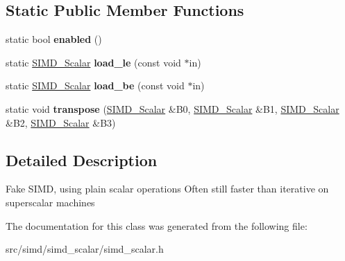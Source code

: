 \subsection*{Static Public Member Functions}
\begin{DoxyCompactItemize}
\item 
\hypertarget{classBotan_1_1SIMD__Scalar_a41ae8453f70b9fceee6469ddd85b8058}{static bool {\bfseries enabled} ()}\label{classBotan_1_1SIMD__Scalar_a41ae8453f70b9fceee6469ddd85b8058}

\item 
\hypertarget{classBotan_1_1SIMD__Scalar_a428cef88433d3a3714a86a27ee32b949}{static \hyperlink{classBotan_1_1SIMD__Scalar}{S\-I\-M\-D\-\_\-\-Scalar} {\bfseries load\-\_\-le} (const void $\ast$in)}\label{classBotan_1_1SIMD__Scalar_a428cef88433d3a3714a86a27ee32b949}

\item 
\hypertarget{classBotan_1_1SIMD__Scalar_a831917b17f550da9de4adcff57107ba2}{static \hyperlink{classBotan_1_1SIMD__Scalar}{S\-I\-M\-D\-\_\-\-Scalar} {\bfseries load\-\_\-be} (const void $\ast$in)}\label{classBotan_1_1SIMD__Scalar_a831917b17f550da9de4adcff57107ba2}

\item 
\hypertarget{classBotan_1_1SIMD__Scalar_a732fa7c90ab3b7995c0d319f9e10cfee}{static void {\bfseries transpose} (\hyperlink{classBotan_1_1SIMD__Scalar}{S\-I\-M\-D\-\_\-\-Scalar} \&B0, \hyperlink{classBotan_1_1SIMD__Scalar}{S\-I\-M\-D\-\_\-\-Scalar} \&B1, \hyperlink{classBotan_1_1SIMD__Scalar}{S\-I\-M\-D\-\_\-\-Scalar} \&B2, \hyperlink{classBotan_1_1SIMD__Scalar}{S\-I\-M\-D\-\_\-\-Scalar} \&B3)}\label{classBotan_1_1SIMD__Scalar_a732fa7c90ab3b7995c0d319f9e10cfee}

\end{DoxyCompactItemize}


\subsection{Detailed Description}
Fake S\-I\-M\-D, using plain scalar operations Often still faster than iterative on superscalar machines 

The documentation for this class was generated from the following file\-:\begin{DoxyCompactItemize}
\item 
src/simd/simd\-\_\-scalar/simd\-\_\-scalar.\-h\end{DoxyCompactItemize}
